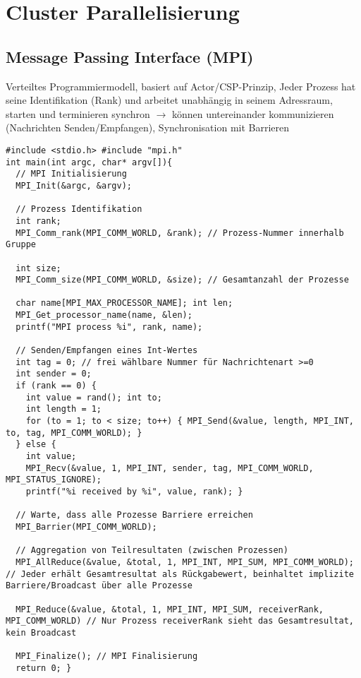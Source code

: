 \section{Cluster Parallelisierung}

\subsection{Message Passing Interface (MPI)}

Verteiltes Programmiermodell, basiert auf Actor/CSP-Prinzip, Jeder Prozess hat seine Identifikation (Rank) und arbeitet unabhängig in seinem Adressraum, starten und terminieren synchron $\rightarrow$ können untereinander kommunizieren (Nachrichten Senden/Empfangen), Synchronisation mit Barrieren


\begin{lstlisting}
#include <stdio.h> #include "mpi.h"
int main(int argc, char* argv[]){
  // MPI Initialisierung
  MPI_Init(&argc, &argv);

  // Prozess Identifikation
  int rank;
  MPI_Comm_rank(MPI_COMM_WORLD, &rank); // Prozess-Nummer innerhalb Gruppe

  int size;
  MPI_Comm_size(MPI_COMM_WORLD, &size); // Gesamtanzahl der Prozesse

  char name[MPI_MAX_PROCESSOR_NAME]; int len;
  MPI_Get_processor_name(name, &len);
  printf("MPI process %i", rank, name);

  // Senden/Empfangen eines Int-Wertes
  int tag = 0; // frei wählbare Nummer für Nachrichtenart >=0
  int sender = 0;
  if (rank == 0) {
    int value = rand(); int to;
    int length = 1;
    for (to = 1; to < size; to++) { MPI_Send(&value, length, MPI_INT, to, tag, MPI_COMM_WORLD); }
  } else {
    int value;
    MPI_Recv(&value, 1, MPI_INT, sender, tag, MPI_COMM_WORLD, MPI_STATUS_IGNORE);
    printf("%i received by %i", value, rank); }

  // Warte, dass alle Prozesse Barriere erreichen
  MPI_Barrier(MPI_COMM_WORLD);

  // Aggregation von Teilresultaten (zwischen Prozessen)
  MPI_AllReduce(&value, &total, 1, MPI_INT, MPI_SUM, MPI_COMM_WORLD); // Jeder erhält Gesamtresultat als Rückgabewert, beinhaltet implizite Barriere/Broadcast über alle Prozesse

  MPI_Reduce(&value, &total, 1, MPI_INT, MPI_SUM, receiverRank, MPI_COMM_WORLD) // Nur Prozess receiverRank sieht das Gesamtresultat, kein Broadcast

  MPI_Finalize(); // MPI Finalisierung
  return 0; }
\end{lstlisting}

